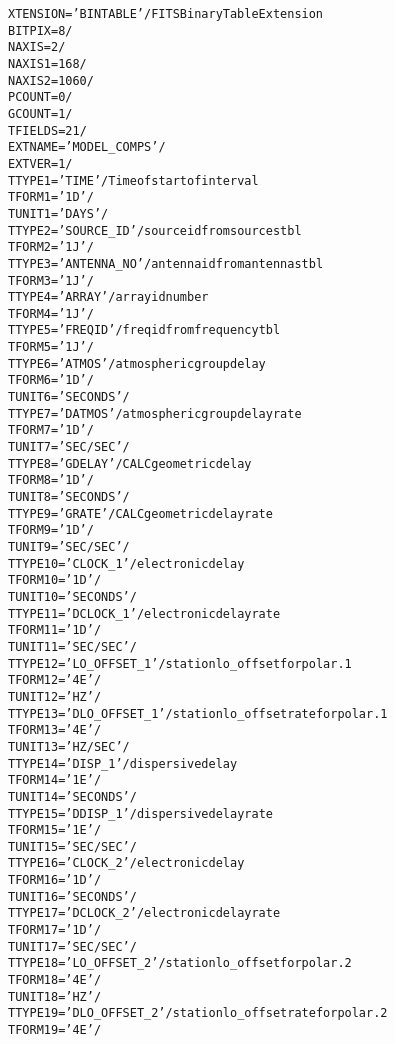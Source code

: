 \documentclass[twoside]{article}
\newcommand{\Ex}[1]{\textcolor{excol}{#1}}
\begin{document}
\begin{alltt}
XTENSION= 'BINTABLE'           / FITS Binary Table Extension
BITPIX  =                    8 /
NAXIS   =                    2 /
NAXIS1  =                  168 /
NAXIS2  =                 1060 /
PCOUNT  =                    0 /
GCOUNT  =                    1 /
TFIELDS =                   21 /
EXTNAME = 'MODEL_COMPS'        /
EXTVER  =                    1 /
\Ex{TTYPE1  = 'TIME    '           / Time of start of interval}
TFORM1  = '1D      '           /
TUNIT1  = 'DAYS    '           /
TTYPE2  = 'SOURCE_ID'          / source id from sources tbl
TFORM2  = '1J      '           /
TTYPE3  = 'ANTENNA_NO'         / antenna id from antennas tbl
TFORM3  = '1J      '           /
TTYPE4  = 'ARRAY   '           / array id number
TFORM4  = '1J      '           /
TTYPE5  = 'FREQID  '           / freq id from frequency tbl
TFORM5  = '1J      '           /
TTYPE6  = 'ATMOS   '           / atmospheric group delay
TFORM6  = '1D      '           /
TUNIT6  = 'SECONDS '           /
TTYPE7  = 'DATMOS  '           / atmospheric group delay rate
TFORM7  = '1D      '           /
TUNIT7  = 'SEC/SEC '           /
TTYPE8  = 'GDELAY  '           / CALC geometric delay
TFORM8  = '1D      '           /
TUNIT8  = 'SECONDS '           /
TTYPE9  = 'GRATE   '           / CALC geometric delay rate
TFORM9  = '1D      '           /
TUNIT9  = 'SEC/SEC '           /
TTYPE10 = 'CLOCK_1 '           / electronic delay
TFORM10 = '1D      '           /
TUNIT10 = 'SECONDS '           /
TTYPE11 = 'DCLOCK_1'           / electronic delay rate
TFORM11 = '1D      '           /
TUNIT11 = 'SEC/SEC '           /
TTYPE12 = 'LO_OFFSET_1'        / station lo_offset for polar. 1
TFORM12 = '4E      '           /
TUNIT12 = 'HZ      '           /
TTYPE13 = 'DLO_OFFSET_1'       / station lo_offset rate for polar. 1
TFORM13 = '4E      '           /
TUNIT13 = 'HZ/SEC  '           /
TTYPE14 = 'DISP_1  '           / dispersive delay
TFORM14 = '1E      '           /
TUNIT14 = 'SECONDS '           /
TTYPE15 = 'DDISP_1 '           / dispersive delay rate
TFORM15 = '1E      '           /
TUNIT15 = 'SEC/SEC '           /
TTYPE16 = 'CLOCK_2 '           / electronic delay
TFORM16 = '1D      '           /
TUNIT16 = 'SECONDS '           /
TTYPE17 = 'DCLOCK_2'           / electronic delay rate
TFORM17 = '1D      '           /
TUNIT17 = 'SEC/SEC '           /
TTYPE18 = 'LO_OFFSET_2'        / station lo_offset for polar. 2
TFORM18 = '4E      '           /
TUNIT18 = 'HZ      '           /
TTYPE19 = 'DLO_OFFSET_2'       / station lo_offset rate for polar. 2
TFORM19 = '4E      '           /

\end{alltt}
\end{document}
